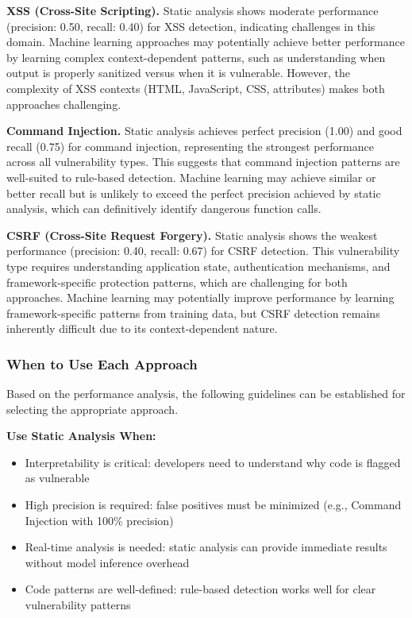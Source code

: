 \textbf{XSS (Cross-Site Scripting).}
Static analysis shows moderate performance (precision: 0.50, recall: 0.40) for XSS detection, indicating challenges in this domain. Machine learning approaches may potentially achieve better performance by learning complex context-dependent patterns, such as understanding when output is properly sanitized versus when it is vulnerable. However, the complexity of XSS contexts (HTML, JavaScript, CSS, attributes) makes both approaches challenging.

\textbf{Command Injection.}
Static analysis achieves perfect precision (1.00) and good recall (0.75) for command injection, representing the strongest performance across all vulnerability types. This suggests that command injection patterns are well-suited to rule-based detection. Machine learning may achieve similar or better recall but is unlikely to exceed the perfect precision achieved by static analysis, which can definitively identify dangerous function calls.

\textbf{CSRF (Cross-Site Request Forgery).}
Static analysis shows the weakest performance (precision: 0.40, recall: 0.67) for CSRF detection. This vulnerability type requires understanding application state, authentication mechanisms, and framework-specific protection patterns, which are challenging for both approaches. Machine learning may potentially improve performance by learning framework-specific patterns from training data, but CSRF detection remains inherently difficult due to its context-dependent nature.

\subsubsection{When to Use Each Approach}
\label{sec:when_to_use}

Based on the performance analysis, the following guidelines can be established for selecting the appropriate approach.

\textbf{Use Static Analysis When:}
\begin{itemize}
	\item Interpretability is critical: developers need to understand why code is flagged as vulnerable
	\item High precision is required: false positives must be minimized (e.g., Command Injection with 100\% precision)
	\item Real-time analysis is needed: static analysis can provide immediate results without model inference overhead
	\item Code patterns are well-defined: rule-based detection works well for clear vulnerability patterns
\end{itemize}

